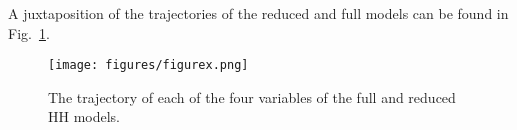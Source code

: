 \documentclass{llncs}
\newcommand{\D}[2]{ \ensuremath{ \frac{\mathrm{d} #1 }{\mathrm{d} #2 } }}
\begin{document}
    A juxtaposition of the trajectories of the reduced and full models can be found
    in Fig.~\ref{reduced-trajectory-faraway}.
    \begin{figure}[h!] \centering
        \texttt{[image: figures/figurex.png]}
        \caption{The trajectory of each of the four variables of the full and
         reduced HH models.}
        \label{reduced-trajectory-faraway}
    \end{figure}


%
\end{document}
